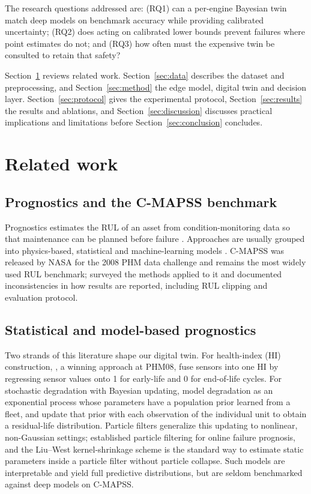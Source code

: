 \documentclass[preprint,12pt,authoryear]{elsarticle}
\begin{document}
The research questions addressed are: (RQ1) can a per-engine Bayesian twin match deep models on benchmark accuracy while providing calibrated uncertainty; (RQ2) does acting on calibrated lower bounds prevent failures where point estimates do not; and (RQ3) how often must the expensive twin be consulted to retain that safety?

Section~\ref{sec:related} reviews related work. Section~\ref{sec:data} describes the dataset and preprocessing, and Section~\ref{sec:method} the edge model, digital twin and decision layer. Section~\ref{sec:protocol} gives the experimental protocol, Section~\ref{sec:results} the results and ablations, and Section~\ref{sec:discussion} discusses practical implications and limitations before Section~\ref{sec:conclusion} concludes.

\section{Related work}\label{sec:related}

\subsection{Prognostics and the C-MAPSS benchmark}
Prognostics estimates the RUL of an asset from condition-monitoring data so that maintenance can be planned before failure \citep{jardine2006review,lei2018review}. Approaches are usually grouped into physics-based, statistical and machine-learning models \citep{si2011review,lei2018review}. C-MAPSS \citep{saxena2008damage} was released by NASA for the 2008 PHM data challenge and remains the most widely used RUL benchmark; \citet{ramasso2014benchmark} surveyed the methods applied to it and documented inconsistencies in how results are reported, including RUL clipping and evaluation protocol.

\subsection{Statistical and model-based prognostics}
Two strands of this literature shape our digital twin. For health-index (HI) construction, \citet{wang2008similarity}, a winning approach at PHM08, fuse sensors into one HI by regressing sensor values onto 1 for early-life and 0 for end-of-life cycles. For stochastic degradation with Bayesian updating, \citet{gebraeel2005residual} model degradation as an exponential process whose parameters have a population prior learned from a fleet, and update that prior with each observation of the individual unit to obtain a residual-life distribution. Particle filters \citep{arulampalam2002tutorial} generalize this updating to nonlinear, non-Gaussian settings; \citet{orchard2009particle} established particle filtering for online failure prognosis, and the Liu--West kernel-shrinkage scheme \citep{liu2001combined} is the standard way to estimate static parameters inside a particle filter without particle collapse. Such models are interpretable and yield full predictive distributions, but are seldom benchmarked against deep models on C-MAPSS.
\end{document}
